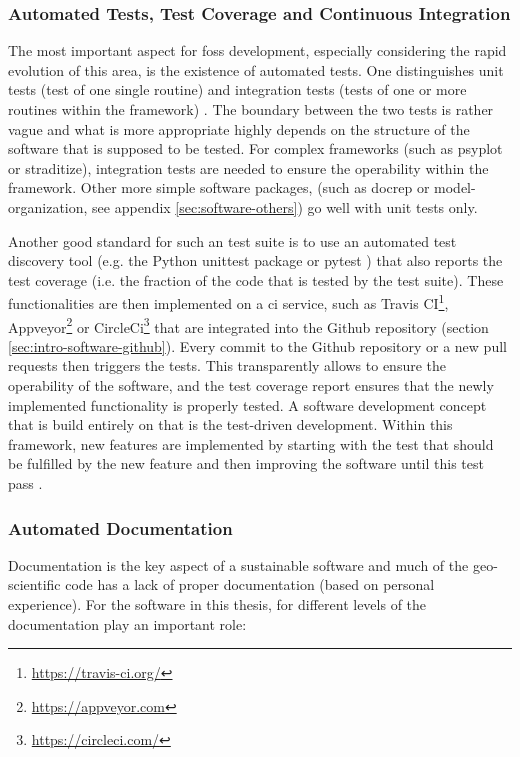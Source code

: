 \begin{refsection}
\subsubsection{Automated Tests, Test Coverage and Continuous Integration} \label{sec:intro-software-ci}
The most important aspect for \gls{foss} development, especially considering the rapid evolution of this area, is the existence of automated tests. One distinguishes unit tests (test of one single routine) and integration tests (tests of one or more routines within the framework) \citep{Shaw2018}. The boundary between the two tests is rather vague and what is more appropriate highly depends on the structure of the software that is supposed to be tested. For complex frameworks (such as psyplot or straditize), integration tests are needed to ensure the operability within the framework. Other more simple software packages, (such as docrep or model-organization, see appendix \ref{sec:software-others}) go well with unit tests only.

Another good standard for such an test suite is to use an automated test discovery tool (e.g. the Python unittest package \citep{PSF2019} or pytest \citep{KrekelOliveiraPfannschmidtEtAl2004}) that also reports the test coverage (i.e. the fraction of the code that is tested by the test suite). These functionalities are then implemented on a \gls{ci} service, such as Travis CI\footnote{\url{https://travis-ci.org/}}, Appveyor\footnote{\url{https://appveyor.com}} or CircleCi\footnote{\url{https://circleci.com/}} that are integrated into the Github repository (section \ref{sec:intro-software-github}). Every commit to the Github repository or a new pull requests then triggers the tests. This transparently allows to ensure the operability of the software, and the test coverage report ensures that the newly implemented functionality is properly tested. A software development concept that is build entirely on that is the test-driven development. Within this framework, new features are implemented by starting with the test that should be fulfilled by the new feature and then improving the software until this test pass \citep{Beck2002}.


\subsubsection{Automated Documentation} \label{sec:intro-software-docs}
Documentation is the key aspect of a sustainable software and much of the geo-scientific code has a lack of proper documentation (based on personal experience). For the software in this thesis, for different levels of the documentation play an important role:


\end{refsection}
